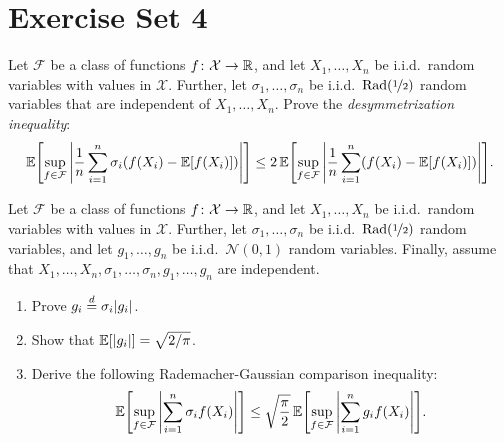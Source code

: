 \section{Exercise Set 4}

\begin{exercise}
Let $\mathcal{F}$ be a class of functions $f \colon \mathcal{X} \to \mathbb{R}$, and let $X_1, \dots, X_n$ be i.i.d.\ random variables with values in $\mathcal{X}$. Further, let $\sigma_1, \dots, \sigma_n$ be i.i.d.\ $\operatorname{Rad}(\nicefrac{1}{2})$ random variables that are independent of $X_1, \dots, X_n$. Prove the \emph{desymmetrization inequality}:
\[
    \Exp\left[\sup_{f \in \mathcal{F}} \abs{\frac{1}{n} \sum_{i=1}^n \sigma_i (f(X_i) - \Exp[f(X_i)])}\right] \leq 2 \Exp\left[\sup_{f \in \mathcal{F}} \abs{\frac{1}{n} \sum_{i=1}^n (f(X_i) - \Exp[f(X_i)])}\right].
\]
\end{exercise}


\begin{exercise}
Let $\mathcal{F}$ be a class of functions $f \colon \mathcal{X} \to \mathbb{R}$, and let $X_1, \dots, X_n$ be i.i.d.\ random variables with values in $\mathcal{X}$. Further, let $\sigma_1, \dots, \sigma_n$ be i.i.d.\ $\operatorname{Rad}(\nicefrac{1}{2})$ random variables, and let $g_1, \dots, g_n$ be i.i.d.\ $\mathcal{N}(0, 1)$ random variables. Finally, assume that $X_1, \dots, X_n, \sigma_1, \dots, \sigma_n, g_1, \dots, g_n$ are independent.
\begin{enumerate}
    \item Prove $g_i \stackrel{d}{=} \sigma_i \abs{g_i}$.

    \item Show that $\operatorname{\mathbb{E}}[\abs{g_i}] = \sqrt{2 / \pi}$.

    \item Derive the following Rademacher-Gaussian comparison inequality:
            \[
                \Exp\left[\sup_{f \in \mathcal{F}} \abs{\sum_{i=1}^n \sigma_i f(X_i)}\right] \leq \sqrt{\frac{\pi}{2}} \Exp\left[\sup_{f \in \mathcal{F}} \abs{\sum_{i=1}^n g_i f(X_i)}\right] .
            \]
\end{enumerate}
\end{exercise}


\begin{exercise}
\end{exercise}
